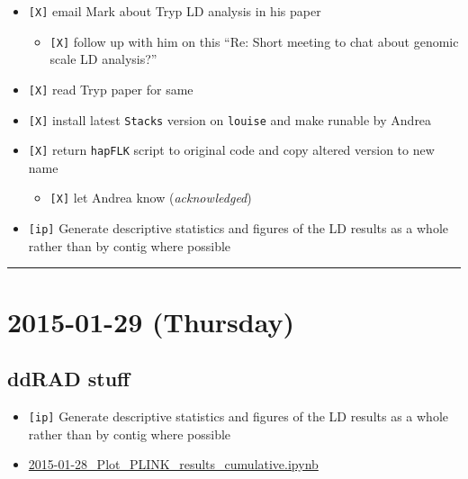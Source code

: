 \documentclass[letterpaper]{scrartcl}
\begin{document}
\begin{itemize}
\itemsep1pt\parskip0pt
\item
  \texttt{{[}X{]}} email Mark about Tryp LD analysis in his paper

  \begin{itemize}
  \itemsep1pt\parskip0pt
  \item
    \texttt{{[}X{]}} follow up with him on this ``Re: Short meeting to
    chat about genomic scale LD analysis?''
  \end{itemize}
\item
  \texttt{{[}X{]}} read Tryp paper for same
\item
  \texttt{{[}X{]}} install latest \texttt{Stacks} version on
  \texttt{louise} and make runable by Andrea
\item
  \texttt{{[}X{]}} return \texttt{hapFLK} script to original code and
  copy altered version to new name

  \begin{itemize}
  \itemsep1pt\parskip0pt
  \item
    \texttt{{[}X{]}} let Andrea know (\emph{acknowledged})
  \end{itemize}
\item
  \texttt{{[}ip{]}} Generate descriptive statistics and figures of the
  LD results as a whole rather than by contig where possible
\end{itemize}

\begin{center}\rule{0.5\linewidth}{\linethickness}\end{center}

\section{2015-01-29 (Thursday)}\label{thursday-3}

\subsection{ddRAD stuff}\label{ddrad-stuff-1}

\begin{itemize}
\itemsep1pt\parskip0pt
\item
  \texttt{{[}ip{]}} Generate descriptive statistics and figures of the
  LD results as a whole rather than by contig where possible
\item
  \href{file:///home/gus/Dropbox/common/ipy_notebooks/YALE/ddrad58/2015-01-28_Plot_PLINK_results_cumulative.ipynb}{2015-01-28\_Plot\_PLINK\_results\_cumulative.ipynb}
\end{itemize}
\end{document}
